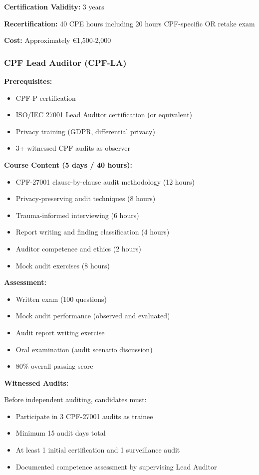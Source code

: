\documentclass[11pt,a4paper]{article}
\begin{document}
\textbf{Certification Validity:} 3 years

\textbf{Recertification:} 40 CPE hours including 20 hours CPF-specific OR retake exam

\textbf{Cost:} Approximately €1,500-2,000

\subsubsection{CPF Lead Auditor (CPF-LA)}

\textbf{Prerequisites:}
\begin{itemize}
\item CPF-P certification
\item ISO/IEC 27001 Lead Auditor certification (or equivalent)
\item Privacy training (GDPR, differential privacy)
\item 3+ witnessed CPF audits as observer
\end{itemize}

\textbf{Course Content (5 days / 40 hours):}

\begin{itemize}
\item CPF-27001 clause-by-clause audit methodology (12 hours)
\item Privacy-preserving audit techniques (8 hours)
\item Trauma-informed interviewing (6 hours)
\item Report writing and finding classification (4 hours)
\item Auditor competence and ethics (2 hours)
\item Mock audit exercises (8 hours)
\end{itemize}

\textbf{Assessment:}
\begin{itemize}
\item Written exam (100 questions)
\item Mock audit performance (observed and evaluated)
\item Audit report writing exercise
\item Oral examination (audit scenario discussion)
\item 80\% overall passing score
\end{itemize}

\textbf{Witnessed Audits:}

Before independent auditing, candidates must:
\begin{itemize}
\item Participate in 3 CPF-27001 audits as trainee
\item Minimum 15 audit days total
\item At least 1 initial certification and 1 surveillance audit
\item Documented competence assessment by supervising Lead Auditor
\end{itemize}
\end{document}
